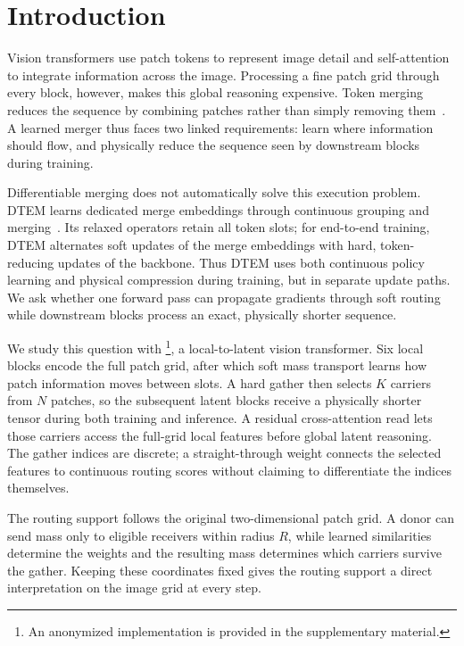 \section{Introduction}

Vision transformers use patch tokens to represent image detail and
self-attention to integrate information across the image. Processing a fine
patch grid through every block, however, makes this global reasoning
expensive. Token merging reduces the sequence by combining patches rather
than simply removing them~\citep{tome2023}. A learned merger thus faces two
linked requirements: learn where information should flow, and physically
reduce the sequence seen by downstream blocks during training.

Differentiable merging does not automatically solve this execution problem.
DTEM learns dedicated merge embeddings through continuous grouping and
merging~\citep{dtem2024}. Its relaxed operators retain all token slots; for
end-to-end training, DTEM alternates soft updates of the merge embeddings
with hard, token-reducing updates of the backbone. Thus DTEM uses both
continuous policy learning and physical compression during training, but in
separate update paths. We ask whether one forward pass can propagate gradients
through soft routing while downstream blocks process an exact, physically
shorter sequence.

We study this question with \mn{}\footnote{An anonymized implementation is
provided in the supplementary material.}, a local-to-latent vision transformer. Six
local blocks encode the full patch grid, after which soft mass transport
learns how patch information moves between slots. A hard gather then selects
$K$ carriers from $N$ patches, so the subsequent latent blocks receive a
physically shorter tensor during both training and inference. A residual
cross-attention read lets those carriers access the full-grid local features
before global latent reasoning. The gather indices are discrete; a
straight-through weight connects the selected features to continuous routing
scores without claiming to differentiate the indices themselves.

The routing support follows the original two-dimensional patch grid. A donor
can send mass only to eligible receivers within radius $R$, while learned
similarities determine the weights and the resulting mass determines which
carriers survive the gather. Keeping these coordinates fixed gives the
routing support a direct interpretation on the image grid at every step.

